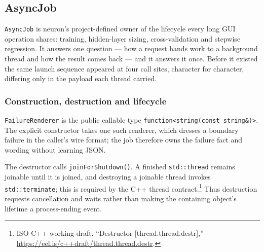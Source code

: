 \subsection{AsyncJob}

\texttt{AsyncJob} is neuron's project-defined owner of the lifecycle every long
GUI operation shares: training,
hidden-layer sizing, cross-validation and stepwise regression.  It answers one
question --- how a request hands work to a background thread and how the result
comes back --- and it answers it once.  Before it existed the same launch
sequence appeared at four call sites, character for character, differing only in
the payload each thread carried.

\subsubsection{Construction, destruction and lifecycle}
\texttt{FailureRenderer} is the public callable type
\texttt{function<string(const string\&)>}.  The explicit constructor takes one
such renderer, which dresses a boundary failure in the caller's wire format;
the job therefore owns the failure fact and wording without learning JSON.

The destructor calls \texttt{joinForShutdown()}.  A finished
\texttt{std::thread} remains joinable until it is joined, and destroying a
joinable thread invokes \texttt{std::terminate}; this is required by the C++
thread contract.\footnote{ISO C++ working draft, ``Destructor
[thread.thread.destr],'' \url{https://eel.is/c++draft/thread.thread.destr}.}
Thus destruction requests cancellation and waits rather than making the
containing object's lifetime a process-ending event.

